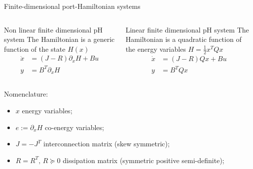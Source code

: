 \documentclass[aspectratio=169]{ISAE-Beamer}
\begin{document}
\begin{frame}{Finite-dimensional port-Hamiltonian systems}

\begin{columns}[T]
\begin{column}{0.45 \textwidth}
\begin{block}{Non linear finite dimensional pH system}
The Hamiltonian is a generic function of the state $H(x)$
	\begin{align*}
	\dot{x} &= (J - R) \partial_x{H} + B u \\
	y &= B^T \partial_x{H}
	\end{align*}
\end{block}
\end{column}
\begin{column}{0.45 \textwidth}
\begin{block}{Linear finite dimensional pH system}
	The Hamiltonian is a quadratic function of the energy variables $H = \frac{1}{2} x^T Q x$
	\begin{align*}
	\dot{x} &= (J - R) Q x + B u \\
	y &= B^T Q x
	\end{align*}
\end{block}
\end{column}
\end{columns}
\vspace{1mm}
Nomenclature:
\begin{itemize}
	\item $x$ energy variables; \\
	\item $e:=\partial_x{H}$ co-energy variables; \\
	\item $J = -J^T$ interconnection matrix (skew symmetric); \\
	\item $R = R^T, \, R \succeq 0$ dissipation matrix (symmetric positive semi-definite); \\
\end{itemize}

\end{frame}
\end{document}
